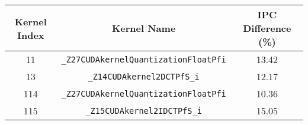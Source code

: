 \begin{tabular}{|c|c|c|}
    \hline
    \textbf{Kernel Index} & \textbf{Kernel Name} & \textbf{IPC Difference (\%)} \\
    \hline
    \hline
    11 & \verb|_Z27CUDAkernelQuantizationFloatPfi| & 13.42 \\
    13 & \verb|_Z14CUDAkernel2DCTPfS_i| & 12.17 \\
    114 & \verb|_Z27CUDAkernelQuantizationFloatPfi| & 10.36 \\
    115 & \verb|_Z15CUDAkernel2IDCTPfS_i| & 15.05 \\
    \hline
\end{tabular}